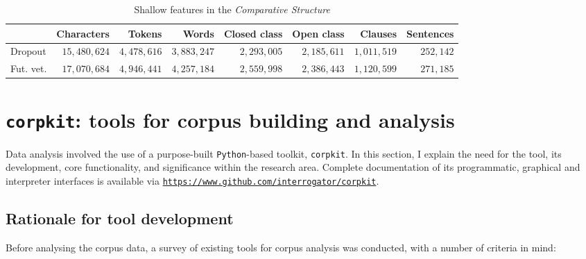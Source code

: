 \begin{table}[htb]
\centering
\footnotesize
\begin{tabular}{lrrrrrrr}

\toprule
{} &  Characters &   Tokens &    Words &  Closed class &  Open class &  Clauses &  Sentences \\
\midrule
Dropout        &    $15,480,624$ &  $4,478,616$ &  $3,883,247$ &  $2,293,005$ &           $2,185,611$ &  $1,011,519$ &     $252,142$ \\
Fut. vet. &    $17,070,684$ &  $4,946,441$ &  $4,257,184$ &  $2,559,998$ &           $2,386,443$ &  $1,120,599$ &     $271,185$ \\
\bottomrule
\end{tabular}
\caption{Shallow features in the \emph{Comparative Structure}}
\label{tab:shallow_C}
\end{table}


\section{\texttt{corpkit}: tools for corpus building and analysis} \label{sect:corpkit}

Data analysis involved the use of a purpose\hyp{}built \texttt{Python}\hyp{}based toolkit, \texttt{corpkit}. In this section, I explain the need for the tool, its development, core functionality, and significance within the research area. Complete documentation of its programmatic, graphical and interpreter interfaces is available via \texttt{\href{https://www.github.com/interrogator/corpkit}{https://www.github.com/interrogator/corpkit}}.

\subsection{Rationale for tool development}

Before analysing the \gls{corpus} data, a survey of existing tools for corpus analysis was conducted, with a number of criteria in mind:

